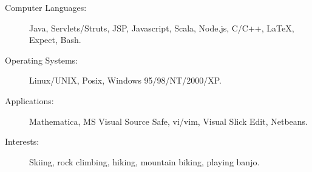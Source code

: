 

\begin{description}
\item[Computer Languages:]
Java, Servlets/Struts, JSP, Javascript, Scala, Node.js, C/C++, \LaTeX, Expect, Bash.
\item[Operating Systems:]
Linux/UNIX, Posix, Windows 95/98/NT/2000/XP.
\item[Applications:]
Mathematica, MS Visual Source Safe, vi/vim, Visual Slick Edit, Netbeans.
\item[Interests:]
Skiing, rock climbing, hiking, mountain biking, playing banjo.
\end{description}
